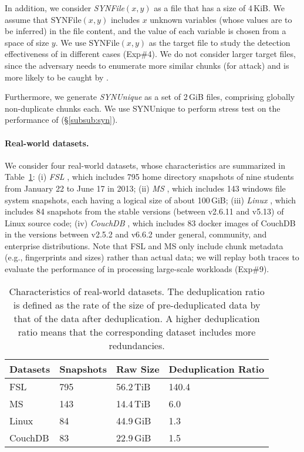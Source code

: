 In addition, we consider {\em SYNFile}$(x, y)$ as a file that has a size of 4\,KiB. We assume that SYNFile$(x, y)$ includes $x$ unknown variables (whose values are to be inferred) in the file content, and the value of each variable is chosen from a space of size $y$. We use SYNFile$(x, y)$ as the target file to study the detection effectiveness of \sysnameF in different cases (Exp\#4). We do not consider larger target files, since the adversary needs to enumerate more similar chunks (for attack) and is more likely to be caught by \sysnameF.

Furthermore, we generate {\em SYNUnique} as a set of 2\,GiB files, comprising globally non-duplicate chunks each. We use SYNUnique to perform stress test on the performance of \prototype (\S\ref{subsub:syn}).



\paragraph{Real-world datasets.} We consider four real-world datasets, whose characteristics are summarized in Table~\ref{tab:datasets}: (i) {\em FSL} \cite{fsl}, which includes 795 home directory snapshots of nine students from January 22 to June 17 in 2013; (ii) {\em MS} \cite{meyer11}, which includes 143 windows file system snapshots, each having a logical size of about 100\,GiB; (iii) {\em Linux} \cite{linux}, which includes 84 snapshots from the stable versions (between v2.6.11 and v5.13) of Linux source code; (iv) {\em CouchDB} \cite{couchdb}, which includes 83 docker images of CouchDB in the versions between v2.5.2 and v6.6.2 under general, community, and enterprise distributions.
Note that FSL and MS only include chunk metadata (e.g., fingerprints and sizes) rather than actual data; we will replay both traces to evaluate the performance of \prototype in processing large-scale workloads (Exp\#9).


\begin{table}
  \centering
  \small
  \begin{tabular}{|l|l|l|l|}
    \hline
    {\bf Datasets} & {\bf Snapshots} & {\bf Raw Size} & {\bf Deduplication Ratio} \\
    \hline
    \hline
    FSL & 795 & 56.2\,TiB & 140.4 \\
    \hline
    MS & 143 & 14.4\,TiB & 6.0 \\
    \hline
    Linux & 84 & 44.9\,GiB & 1.3 \\
    \hline
    CouchDB & 83 & 22.9\,GiB & 1.5 \\
    \hline
  \end{tabular}
  \caption{Characteristics of real-world datasets. The deduplication ratio is defined as the rate of the size of pre-deduplicated data by that of the data after deduplication. A higher deduplication ratio means that the corresponding dataset includes more redundancies.}
  \vspace{-6pt}
  \label{tab:datasets}
\end{table}




